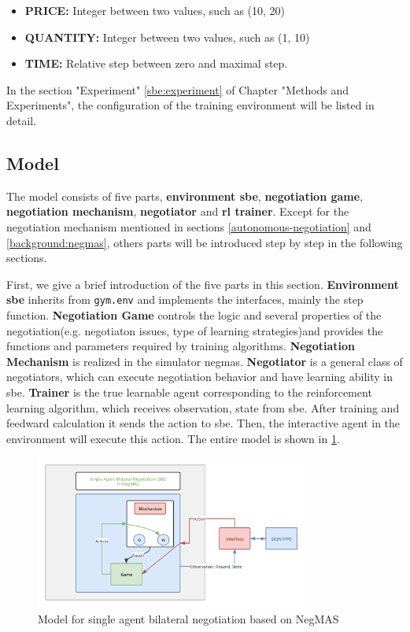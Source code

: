 \begin{itemize}
	\item \textbf{PRICE:} Integer between two values, such as (10, 20)
	\item \textbf{QUANTITY:} Integer between two values, such as (1, 10)
	\item \textbf{TIME:} Relative step between zero and maximal step.
\end{itemize}


In the section "Experiment" \ref{sbe:experiment} of Chapter "Methods and Experiments", the configuration of the training environment will be listed in detail.
 
\subsection{Model}
The model consists of five parts, \textbf{environment \gls{sbe}}, \textbf{negotiation game}, \textbf{negotiation mechanism}, \textbf{negotiator} and \textbf{\gls{rl} trainer}.
Except for the negotiation mechanism mentioned in sections \ref{autonomous-negotiation} and \ref{background:negmas}, others parts will be introduced step by step in the following sections. 

First, we give a brief introduction of the five parts in this section.
\textbf{Environment \gls{sbe}} inherits from \texttt{gym.env} and implements the interfaces, mainly the step function. 
\textbf{Negotiation Game} controls the logic and several properties of the negotiation(e.g. negotiaton issues, type of learning strategies)and provides the functions and parameters required by training algorithms.
\textbf{Negotiation Mechanism} is realized in the simulator \gls{negmas}.
\textbf{Negotiator} is a general class of negotiators, which can execute negotiation behavior and have learning ability in \gls{sbe}.
\textbf{Trainer} is the true learnable agent corresponding to the reinforcement learning algorithm, which receives observation, state from \gls{sbe}. After training and feedward calculation it sends the action to \gls{sbe}. Then, the interactive agent in the environment will execute this action. The entire model is shown in \ref{fig:environment-single-agent}.
\begin{figure}[htbp]
\centering
\includegraphics[width=0.80\textwidth]{./images/sbe.png}
\caption{Model for single agent bilateral negotiation based on NegMAS}
\label{fig:environment-single-agent}
\end{figure}


